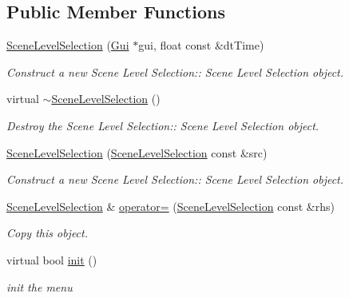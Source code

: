 \subsection*{Public Member Functions}
\begin{DoxyCompactItemize}
\item 
\hyperlink{class_scene_level_selection_ae855a833994439a9f780a0da59dbd3f2}{Scene\+Level\+Selection} (\hyperlink{class_gui}{Gui} $\ast$gui, float const \&dt\+Time)
\begin{DoxyCompactList}\small\item\em Construct a new Scene Level Selection\+:\+: Scene Level Selection object. \end{DoxyCompactList}\item 
\mbox{\label{class_scene_level_selection_a9118a12d319bbbc91d2e6ca3a75f7293}} 
virtual \hyperlink{class_scene_level_selection_a9118a12d319bbbc91d2e6ca3a75f7293}{$\sim$\+Scene\+Level\+Selection} ()
\begin{DoxyCompactList}\small\item\em Destroy the Scene Level Selection\+:\+: Scene Level Selection object. \end{DoxyCompactList}\item 
\hyperlink{class_scene_level_selection_a209ae1ee5432204a65842783208498e3}{Scene\+Level\+Selection} (\hyperlink{class_scene_level_selection}{Scene\+Level\+Selection} const \&src)
\begin{DoxyCompactList}\small\item\em Construct a new Scene Level Selection\+:\+: Scene Level Selection object. \end{DoxyCompactList}\item 
\hyperlink{class_scene_level_selection}{Scene\+Level\+Selection} \& \hyperlink{class_scene_level_selection_aca281d3eb620da5c05951fa128d5aa9f}{operator=} (\hyperlink{class_scene_level_selection}{Scene\+Level\+Selection} const \&rhs)
\begin{DoxyCompactList}\small\item\em Copy this object. \end{DoxyCompactList}\item 
virtual bool \hyperlink{class_scene_level_selection_ab6374f18220f26c22e062bfacc2ff962}{init} ()
\begin{DoxyCompactList}\small\item\em init the menu \end{DoxyCompactList}\item 

\end{DoxyCompactItemize}
